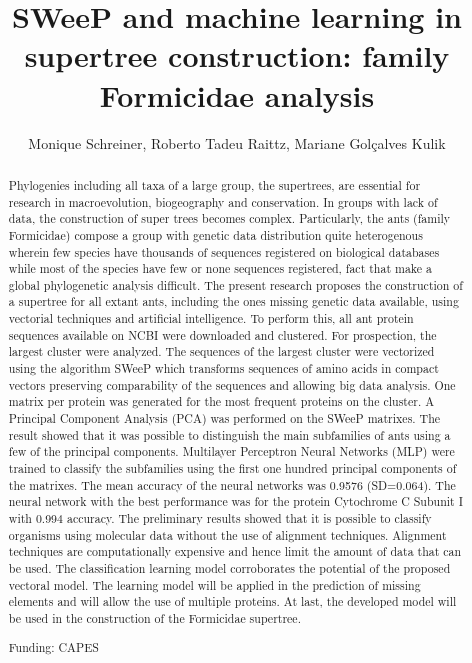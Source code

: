 \documentclass[twoside]{article}
\title{\vspace{-15mm}\fontsize{24pt}{10pt}\selectfont\textbf{ SWeeP and machine learning in supertree construction: family Formicidae analysis }} %
\author{ Monique Schreiner, Roberto Tadeu Raittz, Mariane Gol\c{c}alves Kulik }
\affil{ Universidade Federal do Paran\'a }
\date{}
\begin{document}
  
  
  \maketitle %
  
  
  \thispagestyle{fancy} %
  
  
  \begin{abstract}
  Phylogenies including all taxa of a large group,  the supertrees,  are essential for research in macroevolution,  biogeography and conservation. In groups with lack of data,  the construction of super trees becomes complex. Particularly,  the ants (family Formicidae) compose a group with genetic data distribution quite heterogenous wherein few species have thousands of sequences registered on biological databases while most of the species have few or none sequences registered,  fact that make a global phylogenetic analysis difficult. The present research proposes the construction of a supertree for all extant ants,  including the ones missing genetic data available,  using vectorial techniques and artificial intelligence. To perform this,  all ant protein sequences available on NCBI were downloaded and clustered. For prospection,  the largest cluster were analyzed. The sequences of the largest cluster were vectorized using the algorithm SWeeP which transforms sequences of amino acids in compact vectors preserving comparability of the sequences and allowing big data analysis. One matrix per protein was generated for the most frequent proteins on the cluster. A Principal Component Analysis (PCA) was performed on the SWeeP matrixes. The result showed that it was possible to distinguish the main subfamilies of ants using a few of the principal components. Multilayer Perceptron Neural Networks (MLP) were trained to classify the subfamilies using the first one hundred principal components of the matrixes. The mean accuracy of the neural networks was 0.9576 (SD=0.064). The neural network with the best performance was for the protein Cytochrome C Subunit I with 0.994 accuracy. The preliminary results showed that it is possible to classify organisms using molecular data without the use of alignment techniques. Alignment techniques are computationally expensive and hence limit the amount of data that can be used. The classification learning model corroborates the potential of the proposed vectoral model. The learning model will be applied in the prediction of missing elements and will allow the use of multiple proteins. At last,  the developed model will be used in the construction of the Formicidae supertree.
  
  Funding: CAPES \\ 
  \end{abstract}
  
\end{document}
